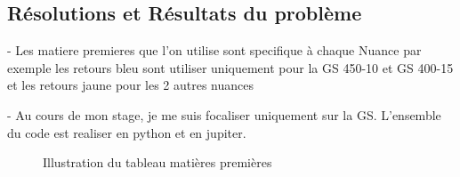 \documentclass[12pt]{article}
\begin{document}





\subsection{Résolutions et Résultats du problème  }


- Les matiere premieres que l'on utilise sont specifique à chaque Nuance
par exemple les retours bleu sont utiliser uniquement pour la GS 450-10
et GS 400-15 et les retours jaune pour les 2 autres nuances


- Au cours de mon stage, je me suis focaliser uniquement sur la GS.
L'ensemble du code est realiser en python et en jupiter.









\begin{figure}[H]
    \centering
    \caption{Illustration du tableau matières premières}
    \label{fig:contraintes1}
\end{figure}
\end{document}
